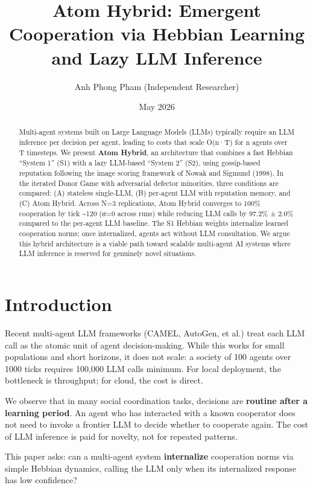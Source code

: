 \documentclass[
  11pt,
  letterpaper,
]{article}
\title{Atom Hybrid: Emergent Cooperation via Hebbian Learning and Lazy
LLM Inference}
\author{Anh Phong Pham (Independent Researcher)}
\date{May 2026}
\begin{document}
\maketitle
\begin{abstract}
Multi-agent systems built on Large Language Models (LLMs) typically
require an LLM inference per decision per agent, leading to costs that
scale O(n·T) for n agents over T timesteps. We present \textbf{Atom
Hybrid}, an architecture that combines a fast Hebbian ``System 1'' (S1)
with a lazy LLM-based ``System 2'' (S2), using gossip-based reputation
following the image scoring framework of Nowak and Sigmund (1998). In
the iterated Donor Game with adversarial defector minorities, three
conditions are compared: (A) stateless single-LLM, (B) per-agent LLM
with reputation memory, and (C) Atom Hybrid. Across N=3 replications,
Atom Hybrid converges to 100\% cooperation by tick \textasciitilde120
(σ=0 across runs) while reducing LLM calls by 97.2\% ± 2.0\% compared to
the per-agent LLM baseline. The S1 Hebbian weights internalize learned
cooperation norms; once internalized, agents act without LLM
consultation. We argue this hybrid architecture is a viable path toward
scalable multi-agent AI systems where LLM inference is reserved for
genuinely novel situations.
\end{abstract}

\section{Introduction}\label{introduction}

Recent multi-agent LLM frameworks (CAMEL, AutoGen, et al.) treat each
LLM call as the atomic unit of agent decision-making. While this works
for small populations and short horizons, it does not scale: a society
of 100 agents over 1000 ticks requires 100,000 LLM calls minimum. For
local deployment, the bottleneck is throughput; for cloud, the cost is
direct.

We observe that in many social coordination tasks, decisions are
\textbf{routine after a learning period}. An agent who has interacted
with a known cooperator does not need to invoke a frontier LLM to decide
whether to cooperate again. The cost of LLM inference is paid for
novelty, not for repeated patterns.

This paper asks: can a multi-agent system \textbf{internalize}
cooperation norms via simple Hebbian dynamics, calling the LLM only when
its internalized response has low confidence?
\end{document}
